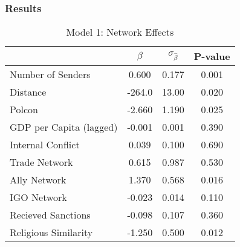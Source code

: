 \documentclass{beamer}
\begin{document}
\begin{frame}
\frametitle{Results}

\begin{table}
\caption{Model 1: Network Effects}
\begin{tabular}{lccc}
\hline
& $\beta$ & $\sigma_{\hat{\beta}}$ & P-value \\
\hline
Number of Senders &  0.600 & 0.177 & 0.001 \\ 
Distance & -264.0 & 13.00 & 0.020 \\
Polcon & -2.660 &  1.190 & 0.025 \\
GDP per Capita (lagged) & -0.001 & 0.001 &  0.390 \\
Internal Conflict & 0.039 &  0.100 & 0.690 \\
Trade Network & 0.615 & 0.987 & 0.530 \\
Ally Network & 1.370 & 0.568 & 0.016 \\
IGO Network &  -0.023 & 0.014 & 0.110 \\
Recieved Sanctions & -0.098 & 0.107 & 0.360 \\
Religious Similarity &  -1.250 & 0.500  & 0.012 \\
\hline
\end{tabular}
\end{table}

\end{frame}

\end{document}

